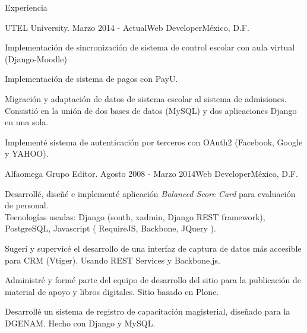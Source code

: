 \documentclass{resume} %
\begin{document}
\begin{rSection}{Experiencia}

\begin{rSubsection}{UTEL University. }{Marzo 2014 - Actual}{Web Developer}{México, D.F.}
    \item Implementación de sincronización de sistema de control escolar con aula virtual (Django-Moodle)
    \item Implementación de sistema de pagos con PayU.
    \item Migración y adaptación de datos de sistema escolar al sistema de admisiones. Consistió en la unión de dos bases de datos (MySQL) y dos aplicaciones Django en una sola.
    \item Implementé sistema de autenticación por terceros con OAuth2 (Facebook, Google y YAHOO).
\end{rSubsection}
\begin{rSubsection}{Alfaomega Grupo Editor. }{Agosto  2008 - Marzo 2014}{Web Developer}{México, D.F.}
    \item Desarrollé, diseñé e implementé aplicación {\em Balanced Score Card} para evaluación de personal. \\
        Tecnologías usadas: Django (south, xadmin, Django REST framework), PostgreSQL, Javascript ( RequireJS, Backbone, JQuery ).
    \item Sugerí y supervicé el desarrollo de una interfaz de captura de datos más accesible para CRM (Vtiger). Usando REST Services y Backbone.js.
    \item Administré y formé parte del equipo de desarrollo del sitio para la publicación de material de apoyo y libros digitales. Sitio basado en Plone.
    \item Desarrollé un sistema de registro de capacitación magisterial, diseñado para la DGENAM. Hecho con Django y MySQL.
\end{rSubsection}



\end{rSection}
\end{document}
